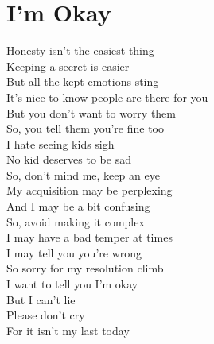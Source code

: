 \documentclass[12pt, b5paper]{article}
\begin{document}
\newpage 

\section{I'm Okay}
Honesty isn’t the easiest thing 
\\Keeping a secret is easier 
\\But all the kept emotions sting 
\\It’s nice to know people are there for you
\\But you don’t want to worry them 
\\So, you tell them you’re fine too
\\I hate seeing kids sigh 
\\No kid deserves to be sad 
\\So, don’t mind me, keep an eye
\\My acquisition may be perplexing 
\\And I may be a bit confusing 
\\So, avoid making it complex 
\\I may have a bad temper at times 
\\I may tell you you’re wrong 
\\So sorry for my resolution climb 
\\I want to tell you I’m okay 
\\But I can’t lie 
\\Please don’t cry
\\For it isn’t my last today

\newpage
\end{document}
